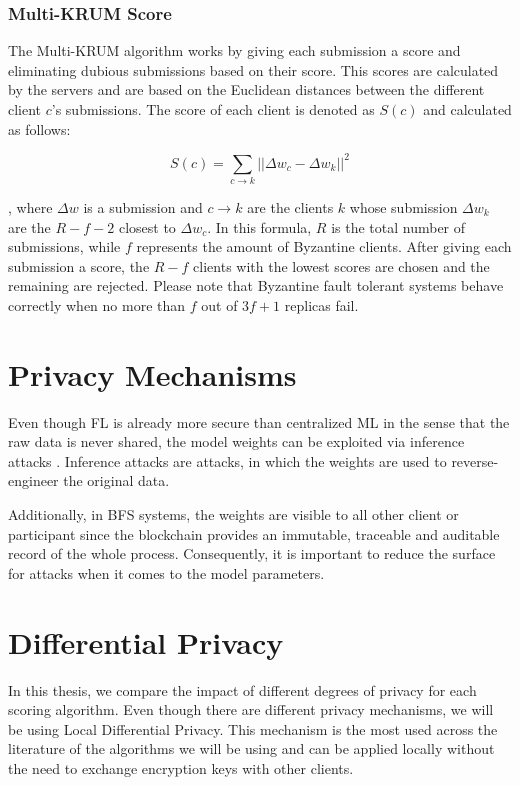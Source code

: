 \subsubsection{Multi-KRUM Score}

The Multi-KRUM algorithm \cite{9170559, Peyvandi2022, 9292450} works by giving each submission a score and eliminating dubious submissions based on their score. This scores are calculated by the servers and are based on the Euclidean distances between the different client $c$'s submissions. The score of each client is denoted as $S(c)$ and calculated as follows:

\begin{equation}
    \label{eq:multi-krum}
    S(c)=\sum_{c \rightarrow k} || \Delta w_c - \Delta w_k|| ^2
\end{equation}

, where $\Delta w$ is a submission and $c \rightarrow k$ are the clients $k$ whose submission $\Delta w_k$ are the $R-f-2$ closest to $\Delta w_c$. In this formula, $R$ is the total number of submissions, while $f$ represents the amount of Byzantine clients. After giving each submission a score, the $R-f$ clients with the lowest scores are chosen and the remaining are rejected. Please note that Byzantine fault tolerant systems behave correctly when no more than $f$ out of $3f+1$ replicas fail.

\section{Privacy Mechanisms}

Even though FL is already more secure than centralized ML in the sense that the raw data is never shared, the model weights can be exploited via inference attacks \cite{10.1145/3298981}. Inference attacks are attacks, in which the weights are used to reverse-engineer the original data.

Additionally, in BFS systems, the weights are visible to all other client or participant since the blockchain provides an immutable, traceable and auditable record of the whole process. Consequently, it is important to reduce the surface for attacks when it comes to the model parameters. 

\section{Differential Privacy}\label{background:diff_priv}

In this thesis, we compare the impact of different degrees of privacy for each scoring algorithm. Even though there are different privacy mechanisms, we will be using Local Differential Privacy. This mechanism is the most used across the literature of the algorithms we will be using and can be applied locally without the need to exchange encryption keys with other clients.


